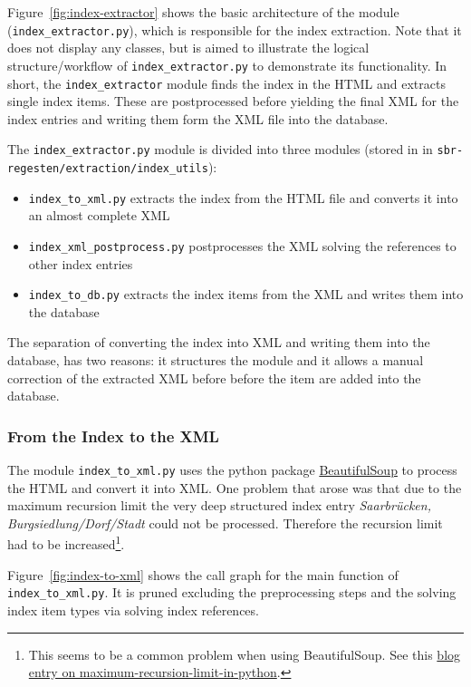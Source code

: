 Figure~\ref{fig:index-extractor} shows the basic architecture of the module (\texttt{index\_extractor.py}), which is responsible for the index extraction. Note that it does not display any classes, but is aimed to illustrate the logical structure/workflow of \texttt{index\_extractor.py} to demonstrate its functionality. In short, the \texttt{index\_extractor} module finds the index in the HTML and extracts single index items. These are postprocessed before yielding the final XML for the index entries and writing them form the XML file into the database.

The \texttt{index\_extractor.py} module is divided into three modules (stored in in \texttt{sbr-regesten/\-extraction/\-index\_utils}):

\begin{itemize}
\item \texttt{index\_to\_xml.py} extracts the index from the HTML file and converts it into an almost complete XML
\item \texttt{index\_xml\_postprocess.py} postprocesses the XML solving the references to other index entries
\item \texttt{index\_to\_db.py} extracts the index items from the XML and writes them into the database
\end{itemize}

The separation of converting the index into XML and writing them into the database, has two reasons: it structures the module and it allows a manual correction of the extracted XML before before the item are added into the database.

\subsubsection{From the Index to the XML}
The module \texttt{index\_to\_xml.py} uses the python package \href{http://www.crummy.com/software/BeautifulSoup/bs4/doc/} {BeautifulSoup} to process the HTML and convert it into XML. One problem that arose was that due to the maximum recursion limit the very deep structured index entry \textit{Saarbrücken, Burgsiedlung/Dorf/Stadt} could not be processed. Therefore the recursion limit had to be increased\footnote{This seems to be a common problem when using BeautifulSoup. See this  \href{http://blog.pablohoffman.com/maximum-recursion-limit-in-python}{blog entry on maximum-recursion-limit-in-python}.}.

Figure~\ref{fig:index-to-xml} shows the call graph for the main function of \texttt{index\_to\_xml.py}. It is pruned excluding the preprocessing steps and the solving index item types via solving index references.


